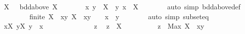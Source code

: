 \begin{isabellebody}
\ {\isachardoublequoteopen}X\ {\isasymnoteq}\ {\isacharbraceleft}{\kern0pt}{\isacharbraceright}{\kern0pt}{\isachardoublequoteclose}\ {\isachardoublequoteopen}bdd{\isacharunderscore}{\kern0pt}above\ X{\isachardoublequoteclose}\isanewline
\ \ \ \ \isamarkupfalse%
\ \isamarkupfalse%
\ x\ y\ \ {\isachardoublequoteopen}X\ {\isasymsubseteq}\ {\isacharbraceleft}{\kern0pt}{\isachardot}{\kern0pt}{\isachardot}{\kern0pt}y{\isacharbraceright}{\kern0pt}{\isachardoublequoteclose}\ {\isachardoublequoteopen}x\ {\isasymin}\ X{\isachardoublequoteclose}\isanewline
\ \ \ \ \ \ \isamarkupfalse%
\ {\isacharparenleft}{\kern0pt}auto\ simp{\isacharcolon}{\kern0pt}\ bdd{\isacharunderscore}{\kern0pt}above{\isacharunderscore}{\kern0pt}def{\isacharparenright}{\kern0pt}\isanewline
\ \ \ \ \isamarkupfalse%
\ \isamarkupfalse%
\ {\isacharasterisk}{\kern0pt}{\isacharcolon}{\kern0pt}\ {\isachardoublequoteopen}finite\ {\isacharparenleft}{\kern0pt}X\ {\isasyminter}\ {\isacharbraceleft}{\kern0pt}x{\isachardot}{\kern0pt}{\isachardot}{\kern0pt}y{\isacharbraceright}{\kern0pt}{\isacharparenright}{\kern0pt}{\isachardoublequoteclose}\ {\isachardoublequoteopen}X\ {\isasyminter}\ {\isacharbraceleft}{\kern0pt}x{\isachardot}{\kern0pt}{\isachardot}{\kern0pt}y{\isacharbraceright}{\kern0pt}\ {\isasymnoteq}\ {\isacharbraceleft}{\kern0pt}{\isacharbraceright}{\kern0pt}{\isachardoublequoteclose}\ \ {\isachardoublequoteopen}x\ {\isasymle}\ y{\isachardoublequoteclose}\isanewline
\ \ \ \ \ \ \isamarkupfalse%
\ {\isacharparenleft}{\kern0pt}auto\ simp{\isacharcolon}{\kern0pt}\ subset{\isacharunderscore}{\kern0pt}eq{\isacharparenright}{\kern0pt}\isanewline
\ \ \ \ \isamarkupfalse%
\ {\isachardoublequoteopen}{\isasymexists}{\isacharbang}{\kern0pt}x{\isasymin}X{\isachardot}{\kern0pt}\ {\isacharparenleft}{\kern0pt}{\isasymforall}y{\isasymin}X{\isachardot}{\kern0pt}\ y\ {\isasymle}\ x{\isacharparenright}{\kern0pt}{\isachardoublequoteclose}\isanewline
\ \ \ \ \isamarkupfalse%
\isanewline
\ \ \ \ \ \ \isacommand{{\isacharbraceleft}{\kern0pt}}\isamarkupfalse%
\ \isamarkupfalse%
\ z\ \isamarkupfalse%
\ {\isachardoublequoteopen}z\ {\isasymin}\ X{\isachardoublequoteclose}\isanewline
\ \ \ \ \ \ \ \ \isamarkupfalse%
\ {\isachardoublequoteopen}z\ {\isasymle}\ Max\ {\isacharparenleft}{\kern0pt}X\ {\isasyminter}\ {\isacharbraceleft}{\kern0pt}x{\isachardot}{\kern0pt}{\isachardot}{\kern0pt}y{\isacharbraceright}{\kern0pt}{\isacharparenright}{\kern0pt}{\isachardoublequoteclose}\isanewline

\end{isabellebody}
